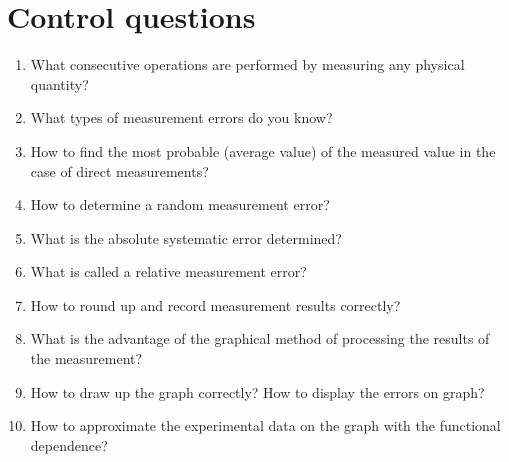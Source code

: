 \documentclass{LabWorkEng}
\begin{document}
\section*{Control questions}

\begin{enumerate}
	\item What consecutive operations are performed by measuring any physical quantity?
	\item What types of measurement errors do you know?
	\item How to find the most probable (average value) of the measured value in the case of direct measurements?
	\item How to determine a random measurement error?
	\item What is the absolute systematic error determined?
	\item What is called a relative measurement error?
	\item How to round up and record measurement results correctly?
	\item What is the advantage of the graphical method of processing the results of the measurement?
	\item How to draw up the graph correctly? How to display the errors on graph?
	\item How to approximate the experimental data on the graph with the functional dependence?
\end{enumerate}
\end{document}
